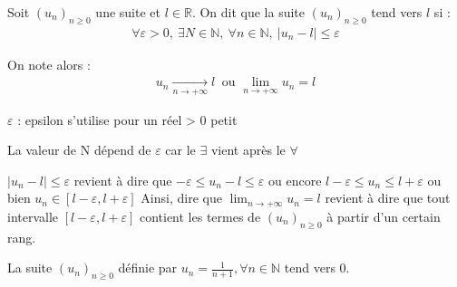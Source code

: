 \begin{graybox}
    \begin{definition}[]
    \par Soit $(u_n)_{n \geqslant 0}$ une suite et $l \in \mathbb{R}$. On dit que la suite $(u_n)_{n \geqslant 0}$ tend vers $l$ si :
    \begin{align*}
    \forall \varepsilon > 0,\ \exists N \in \mathbb{N},\ \forall n \in \mathbb{N},\ |u_n - l| \leqslant \varepsilon
    \end{align*}
    \par On note alors :
    \begin{align*}
    u_n \xrightarrow[n \to +\infty]{}l \ \text{ ou }\lim_{n \to +\infty} u_n = l
    \end{align*}
\end{definition}
\end{graybox}



    \begin{remarque}
    $\varepsilon$ : epsilon s'utilise pour un réel > 0 petit
\end{remarque}



    \begin{remarque}
    La valeur de N dépend de $\varepsilon$ car le $\exists$ vient après le $\forall$
\end{remarque}



    \begin{remarque}
    $|u_n - l| \leqslant \varepsilon$ revient à dire que $-\varepsilon \leqslant u_n - l \leqslant \varepsilon$
    ou encore $l - \varepsilon \leqslant u_n \leqslant l + \varepsilon$
    ou bien $u_n \in [l - \varepsilon, l + \varepsilon]$
    Ainsi, dire que  $\displaystyle{\lim_{n \to +\infty} u_n = l}$ revient à dire que tout intervalle $[l-\varepsilon, l + \varepsilon]$ contient les termes de $(u_n)_{n \geqslant 0}$ à partir d'un certain rang.
\end{remarque}



    \begin{exemple}
    La suite $(u_n)_{n \geqslant 0}$ définie par $u_n = \frac{1}{n+1}, \forall n \in \mathbb{N}$ tend vers 0.
\end{exemple}



